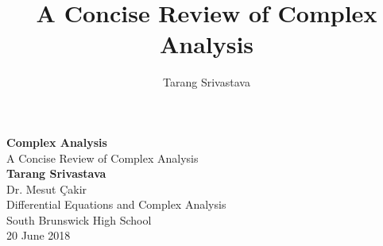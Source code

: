 \documentclass[12pt, letterpaper, twocolumn]{report}
\author{Tarang Srivastava}
\title{A Concise Review of Complex Analysis }
\theoremstyle{definition}
\begin{document}
	\begin{titlepage}
		\begin{center}
			\vspace*{1cm}
			\Huge
			\textbf{Complex Analysis}\\
			\vspace{0.5cm}
			\LARGE
			A Concise Review of Complex Analysis\\
			\vspace{1.5cm}
			\textbf{Tarang Srivastava}\\
			\vfill
			\vspace{0.8cm}
			\Large
			Dr. Mesut \c{C}akir\\
			Differential Equations and Complex Analysis\\
			South Brunswick High School\\
			20 June 2018
		\end{center}
	\end{titlepage}

	\tableofcontents
	
	
	
	
	
	
	
	
\end{document}
